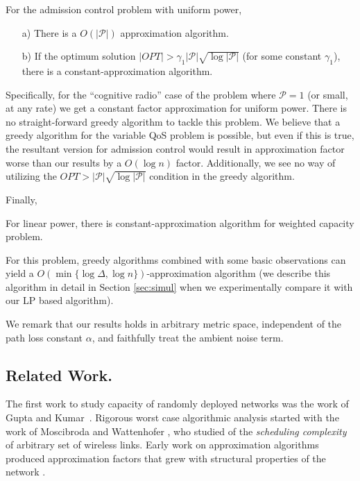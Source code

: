 \documentclass[11pt]{amsart}
\def\calP{{\mathcal P}}
\begin{document}
\begin{theorem}
For the admission control problem with uniform power,
\begin{itemize}
\item[a)] There is a $O(|\calP|)$ approximation algorithm. 
\item[b)] If the optimum solution $|OPT| > \gamma_1 |\calP| \sqrt{\log  |\calP|}$ (for some constant $\gamma_1$), there is a constant-approximation algorithm.
\end{itemize}
\label{mainth2}
\end{theorem}
Specifically, for the ``cognitive radio'' case of the problem where $\calP = 1$ (or small, at any rate) we get a constant factor
approximation for uniform power. There is no straight-forward greedy algorithm to tackle this problem.
We believe that a greedy algorithm for the variable QoS problem is possible, but even if this is true,
the resultant version for admission control would result in approximation factor worse than our results by a $O(\log n)$ factor. Additionally, we see no way of utilizing the $OPT > |\calP| \sqrt{\log |\calP|}$ condition in the greedy algorithm.

Finally,
\begin{theorem}
For linear power, there is  constant-approximation algorithm for weighted capacity problem.
\label{mainth3}
\end{theorem}
For this problem, greedy algorithms combined with some basic observations can yield  a $O(\min\{\log \Delta, \log n\})$-approximation algorithm (we describe this algorithm in detail in Section \ref{sec:simul} when we experimentally compare it with our LP based algorithm). 

We remark that our results holds in arbitrary metric space, independent of the path loss constant $\alpha$, and faithfully treat the ambient noise term.

\subsection*{Related Work.}

The first work to study capacity of randomly deployed networks was the work of Gupta and Kumar~\cite{kumar00}. 
Rigorous worst case algorithmic analysis started with
the  work of Moscibroda and Wattenhofer \cite{MoWa06}, who
studied of the \emph{scheduling complexity} of arbitrary set
of wireless links. 
Early work on approximation algorithms
 produced approximation
factors that grew with structural properties of the network \cite{moscibroda06b,MoscibrodaOW07,chafekar07}.
\end{document}

